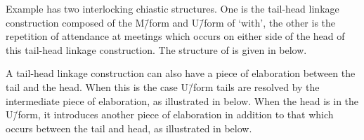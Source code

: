 Example  has two interlocking chiastic structures.
One is the tail-head linkage construction composed
of the M\=/form and U\=/form of  `with',
the other is the repetition of attendance at meetings which occurs
on either side of the head of this tail-head linkage construction.
The structure of  is given in  below.

\begin{exe}
	\label{ex:DouChi}
		\begin{xlist}
		\end{xlist}
\end{exe}

A tail-head linkage construction can also have a piece of
elaboration between the tail and the head.
When this is the case U\=/form tails are resolved by the intermediate
piece of elaboration, as illustrated in  below.
When the head is in the U\=/form, it introduces another piece of elaboration
in addition to that which occurs between the tail and head,
as illustrated in  below.

\begin{exe}
	\label{ex:ChiTaiHeaLin-1b-2}
	\label{ex:ChiTaiHeaLin-2b-2}
\end{exe}